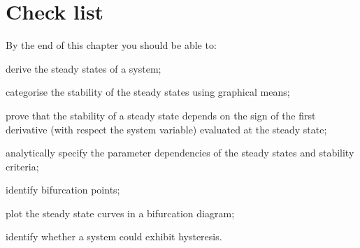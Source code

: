 \section{Check list}
By the end of this chapter you should be able to:
\begin{todolist}
\item derive the steady states of a system;
\item categorise the stability of the steady states using graphical means;
\item prove that the stability of a steady state depends on the sign of the first derivative (with respect the system variable) evaluated at the steady state;
\item analytically specify the parameter dependencies of the steady states and stability criteria;
\item identify bifurcation points;
\item plot the steady state curves in a bifurcation diagram;
\item identify whether a system could exhibit hysteresis. 
\end{todolist}




